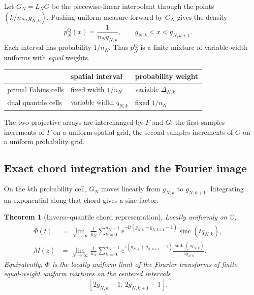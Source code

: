 \documentclass[11pt,oneside]{article}
\newtheorem{theorem}{Theorem}[section]
\theoremstyle{definition}
\theoremstyle{remark}
\newcommand{\C}{\mathbb C}
\newcommand{\sinc}{\operatorname{sinc}}
\newcommand{\e}{\mathrm e}
\newcommand{\ii}{\mathrm i}
\begin{document}
Let $G_N=L_NG$ be the piecewise-linear interpolant through the points
$(k/n_N,g_{N,k})$.  Pushing uniform measure forward by $G_N$ gives the density
\begin{equation}\label{eq:pQN}
 p_N^{\mathrm Q}(x)
 =\frac{1}{n_Nq_{N,k}},
 \qquad g_{N,k}<x<g_{N,k+1}.
\end{equation}
Each interval has probability $1/n_N$.  Thus $p_N^{\mathrm Q}$ is a finite
mixture of variable-width uniforms with \emph{equal} weights.

\begin{resultbox}
\begin{center}
\begin{tabular}{@{}lll@{}}
\toprule
 & spatial interval & probability weight\\
\midrule
primal Fabius cells & fixed width $1/n_N$ & variable $\Delta_{N,k}$\\
dual quantile cells & variable width $q_{N,k}$ & fixed $1/n_N$\\
\bottomrule
\end{tabular}
\end{center}
The two projective arrays are interchanged by $F$ and $G$: the first samples
increments of $F$ on a uniform spatial grid, the second samples increments of
$G$ on a uniform probability grid.
\end{resultbox}

\subsection{Exact chord integration and the Fourier image}

On the $k$th probability cell, $G_N$ moves linearly from $g_{N,k}$ to
$g_{N,k+1}$.  Integrating an exponential along that chord gives a sinc factor.

\begin{theorem}[Inverse-quantile chord representation]
\label{thm:quantile-chord}
Locally uniformly on $\C$,
\begin{align}
 \Phi(t)
 &=\lim_{N\to\infty}\frac1{n_N}
 \sum_{k=0}^{n_N-1}
 \e^{-\ii t(g_{N,k}+g_{N,k+1}-1)}
 \sinc\!\left(tq_{N,k}\right),
 \label{eq:Phi-quantile-chord}\\
 M(z)
 &=\lim_{N\to\infty}\frac1{n_N}
 \sum_{k=0}^{n_N-1}
 \e^{z(g_{N,k}+g_{N,k+1}-1)}
 \frac{\sinh(zq_{N,k})}{zq_{N,k}}.
 \label{eq:M-quantile-chord}
\end{align}
Equivalently, $\Phi$ is the locally uniform limit of the Fourier transforms of
finite equal-weight uniform mixtures on the centered intervals
\begin{equation}\label{eq:centered-quantile-intervals}
 [2g_{N,k}-1,\,2g_{N,k+1}-1].
\end{equation}
\end{theorem}
\end{document}
